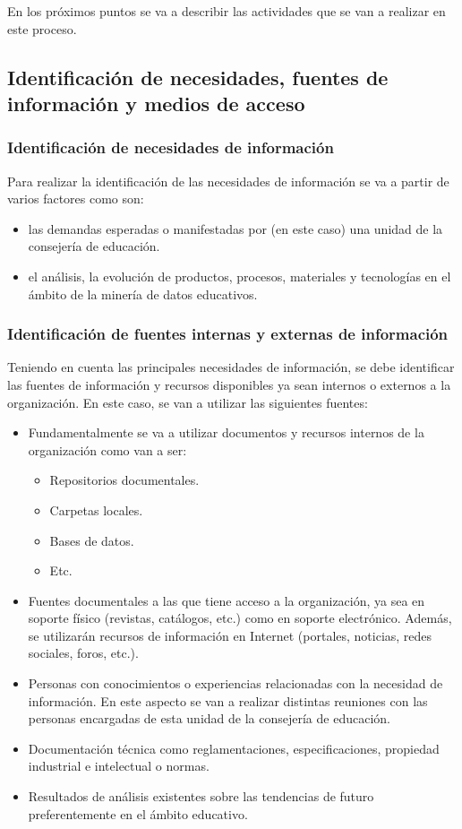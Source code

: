 En los próximos puntos se va a describir las actividades que se van a realizar en este proceso.

\subsection{Identificación de necesidades, fuentes de información y medios de acceso}
\subsubsection{Identificación de necesidades de información}
Para realizar la identificación de las necesidades de información se va a partir de varios factores como son:
\begin{itemize}
\item las demandas esperadas o manifestadas por (en este caso) una unidad de la consejería de educación.
\item el análisis, la evolución de productos, procesos, materiales y tecnologías en el ámbito de la minería de datos educativos.
\end{itemize}

\subsubsection{Identificación de fuentes internas y externas de información}
Teniendo en cuenta las principales necesidades de información, se debe identificar las fuentes de información y recursos disponibles ya sean internos o externos a la organización. En este caso, se van a utilizar las siguientes fuentes:
\begin{itemize}
\item Fundamentalmente se va a utilizar documentos y recursos internos de la organización como van a ser:
\begin{itemize}
\item Repositorios documentales.
\item Carpetas locales.
\item Bases de datos.
\item Etc.
\end{itemize}
\item Fuentes documentales a las que tiene acceso a la organización, ya sea en soporte físico (revistas, catálogos, etc.) como en soporte electrónico. Además, se utilizarán recursos de información en Internet (portales, noticias, redes sociales, foros, etc.). 
\item Personas con conocimientos o experiencias relacionadas con la necesidad de información. En este aspecto se van a realizar distintas reuniones con las personas encargadas de esta unidad de la consejería de educación.
\item Documentación técnica como reglamentaciones, especificaciones, propiedad industrial e intelectual o normas.
\item Resultados de análisis existentes sobre las tendencias de futuro preferentemente en el ámbito educativo.
\end{itemize}

